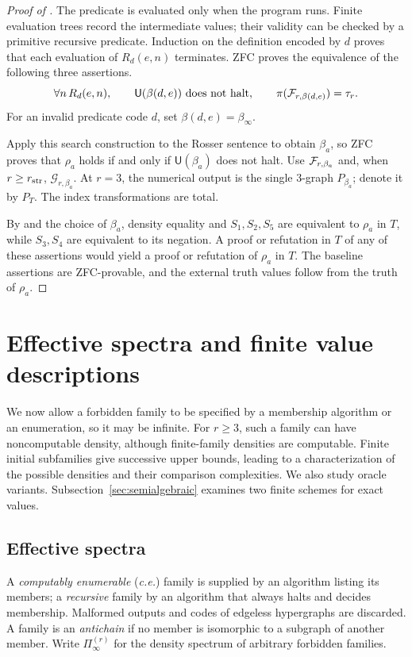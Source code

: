 \documentclass[10pt]{article}
\numberwithin{equation}{section}
\theoremstyle{definition}
\newcommand{\cG}{\mathcal G}\newcommand{\cH}{\mathcal H}\newcommand{\cJ}{\mathcal J}
\begin{document}
\begin{proof}[Proof of ]
The predicate is evaluated only when the program runs. Finite evaluation trees record the intermediate values; their validity can be checked by a primitive recursive predicate. Induction on the definition encoded by $d$ proves that each evaluation of $R_d(e,n)$ terminates. ZFC proves the equivalence of the following three assertions.
\[
 \forall n\,R_d(e,n),\qquad
 \mathsf U(\beta(d,e))\text{ does not halt},\qquad
 \pi(\mathcal F_{r,\beta(d,e)})=\tau_r.
\]
For an invalid predicate code $d$, set $\beta(d,e)=\beta_\infty$.

Apply this search construction to the Rosser sentence to obtain $\beta_a$, so ZFC proves that $\rho_a$ holds if and only if $\mathsf U(\beta_a)$ does not halt. Use $\mathcal F_{r,\beta_a}$ and, when $r\ge r_{\rm str}$, $\cG_{r,\beta_a}$. At $r=3$, the numerical output is the single $3$-graph $P_{\beta_a}$; denote it by $P_T$. The index transformations are total.

By  and the choice of $\beta_a$, density equality and $S_1,S_2,S_5$ are equivalent to $\rho_a$ in $T$, while $S_3,S_4$ are equivalent to its negation. A proof or refutation in $T$ of any of these assertions would yield a proof or refutation of $\rho_a$ in $T$. The baseline assertions are ZFC-provable, and the external truth values follow from the truth of $\rho_a$.
\end{proof}

\section{Effective spectra and finite value descriptions}\label{sec:spectrum}
We now allow a forbidden family to be specified by a membership algorithm or an enumeration, so it may be infinite. For $r\ge3$, such a family can have noncomputable density, although finite-family densities are computable. Finite initial subfamilies give successive upper bounds, leading to a characterization of the possible densities and their comparison complexities. We also study oracle variants. Subsection~\ref{sec:semialgebraic} examines two finite schemes for exact values.

\subsection{Effective spectra}
A \emph{computably enumerable} (\emph{c.e.}) family is supplied by an algorithm listing its members; a \emph{recursive} family by an algorithm that always halts and decides membership. Malformed outputs and codes of edgeless hypergraphs are discarded. A family is an \emph{antichain} if no member is isomorphic to a subgraph of another member. Write $\Pi_\infty^{(r)}$ for the density spectrum of arbitrary forbidden families.
\end{document}
